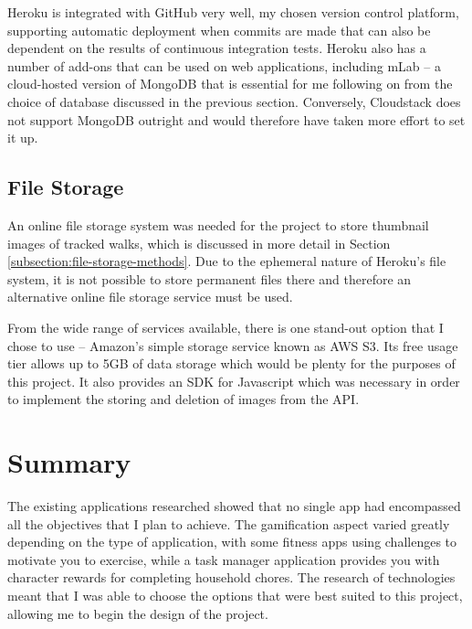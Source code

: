 Heroku is integrated with GitHub very well, my chosen version control platform, supporting automatic deployment when commits are made that can also be dependent on the results of continuous integration tests. Heroku also has a number of add-ons that can be used on web applications, including mLab -- a cloud-hosted version of MongoDB that is essential for me following on from the choice of database discussed in the previous section. Conversely, Cloudstack does not support MongoDB outright and would therefore have taken more effort to set it up.

\subsection{File Storage}

An online file storage system was needed for the project to store thumbnail images of tracked walks, which is discussed in more detail in Section \ref{subsection:file-storage-methods}. Due to the ephemeral nature of Heroku's file system, it is not possible to store permanent files there and therefore an alternative online file storage service must be used.

From the wide range of services available, there is one stand-out option that I chose to use -- Amazon's simple storage service known as AWS S3. Its free usage tier allows up to 5GB of data storage which would be plenty for the purposes of this project. It also provides an SDK for Javascript which was necessary in order to implement the storing and deletion of images from the API.

\section{Summary}

The existing applications researched showed that no single app had encompassed all the objectives that I plan to achieve. The gamification aspect varied greatly depending on the type of application, with some fitness apps using challenges to motivate you to exercise, while a task manager application provides you with character rewards for completing household chores. The research of technologies meant that I was able to choose the options that were best suited to this project, allowing me to begin the design of the project.



